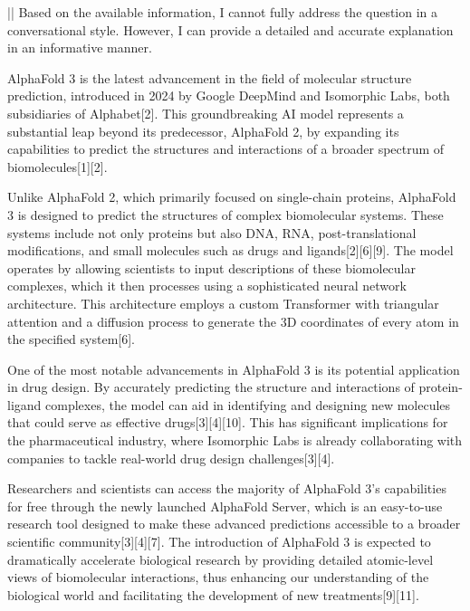 \documentclass[11pt]{article}
\begin{document}
\begin{showcase}[title=Topic: AlphaFold 3]
||
Based on the available information, I cannot fully address the question in a conversational style. However, I can provide a detailed and accurate explanation in an informative manner.

AlphaFold 3 is the latest advancement in the field of molecular structure prediction, introduced in 2024 by Google DeepMind and Isomorphic Labs, both subsidiaries of Alphabet[2]. This groundbreaking AI model represents a substantial leap beyond its predecessor, AlphaFold 2, by expanding its capabilities to predict the structures and interactions of a broader spectrum of biomolecules[1][2]. 

Unlike AlphaFold 2, which primarily focused on single-chain proteins, AlphaFold 3 is designed to predict the structures of complex biomolecular systems. These systems include not only proteins but also DNA, RNA, post-translational modifications, and small molecules such as drugs and ligands[2][6][9]. The model operates by allowing scientists to input descriptions of these biomolecular complexes, which it then processes using a sophisticated neural network architecture. This architecture employs a custom Transformer with triangular attention and a diffusion process to generate the 3D coordinates of every atom in the specified system[6].

One of the most notable advancements in AlphaFold 3 is its potential application in drug design. By accurately predicting the structure and interactions of protein-ligand complexes, the model can aid in identifying and designing new molecules that could serve as effective drugs[3][4][10]. This has significant implications for the pharmaceutical industry, where Isomorphic Labs is already collaborating with companies to tackle real-world drug design challenges[3][4].

Researchers and scientists can access the majority of AlphaFold 3's capabilities for free through the newly launched AlphaFold Server, which is an easy-to-use research tool designed to make these advanced predictions accessible to a broader scientific community[3][4][7]. The introduction of AlphaFold 3 is expected to dramatically accelerate biological research by providing detailed atomic-level views of biomolecular interactions, thus enhancing our understanding of the biological world and facilitating the development of new treatments[9][11].


\end{showcase}
\end{document}
